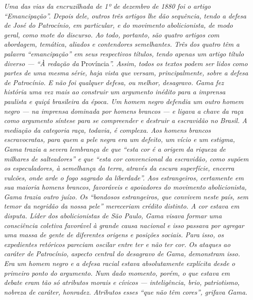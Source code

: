 \begin{didas}
\emph{Uma das vias da encruzilhada de 1º de dezembro de 1880 foi o
artigo ``Emancipação''. Depois dele, outros três artigos lhe dão
sequência, tendo a defesa de José do Patrocínio, em particular, e do
movimento abolicionista, de modo geral, como mote do discurso. Ao todo,
portanto, são quatro artigos com abordagem, temática, aliados e
contendores semelhantes. Três dos quatro têm a palavra ``emancipação'' em
seus respectivos títulos, tendo apenas um artigo título diverso --- ``À redação da}
Província\emph{''. Assim, todos os textos podem ser lidos como partes de uma mesma
série, haja vista que versam, principalmente, sobre a defesa de
Patrocínio. E não foi qualquer defesa, ou melhor, desagravo. Gama fez
história uma vez mais ao construir um argumento inédito para a imprensa
paulista e quiçá brasileira da época. Um homem negro defendia um outro
homem negro --- na imprensa dominada por homens brancos --- e ligava a
chave da raça como argumento síntese para se compreender e destruir a
escravidão no Brasil. A mediação da categoria raça, todavia, é complexa.
Aos homens brancos escravocratas, para quem a pele negra era um defeito,
um vício e um estigma, Gama trazia a severa lembrança de que ``esta cor é
a origem da riqueza de milhares de salteadores'' e que ``esta cor
convencional da escravidão, como supõem os especuladores, à semelhança
da terra, através da escura superfície, encerra vulcões, onde arde o
fogo sagrado da liberdade''. Aos estrangeiros, certamente em sua maioria
homens brancos, favoráveis e apoiadores do movimento abolicionista, Gama
trazia outro juízo. Os ``bondosos estrangeiros, que convivem neste país,
sem temor da negridão da nossa pele'' mereceriam crédito distinto. A cor
estava em disputa. Líder dos abolicionistas de São Paulo, Gama visava
formar uma consciência coletiva favorável à grande causa nacional e isso
passava por agregar uma massa de gente de diferentes origens e posições
sociais. Para isso, os expedientes retóricos pareciam oscilar entre ter
e não ter cor. Os ataques ao caráter de Patrocínio, aspecto central do
desagravo de Gama, demonstram isso. Era um homem negro e a defesa racial
estava absolutamente explícita desde o primeiro ponto do argumento. Num
dado momento, porém, o que estava em debate eram tão só atributos morais
e cívicos --- inteligência, brio, patriotismo, nobreza de caráter,
honradez. Atributos esses ``que não têm cores'', grifava Gama.}
\end{didas}


